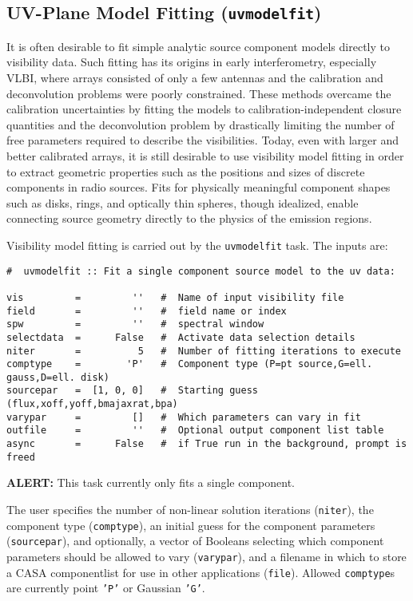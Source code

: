 {%
\subsection{UV-Plane Model Fitting ({\tt uvmodelfit})}
\label{section:cal.other.uvmodelfit}

It is often desirable to fit simple analytic source component models
directly to visibility data.  Such fitting has its origins in early
interferometry, especially VLBI, where arrays consisted of only a few
antennas and the calibration and deconvolution problems were poorly
constrained.  These methods overcame the calibration uncertainties by
fitting the models to calibration-independent closure quantities and
the deconvolution problem by drastically limiting the number of free
parameters required to describe the visibilities.  Today, even with
larger and better calibrated arrays, it is still desirable to use
visibility model fitting in order to extract geometric properties such
as the positions and sizes of discrete components in radio sources.
Fits for physically meaningful component shapes such as disks, rings,
and optically thin spheres, though idealized, enable connecting source
geometry directly to the physics of the emission regions.

Visibility model fitting is carried out by the {\tt uvmodelfit} task.
The inputs are:
\small
\begin{verbatim}
#  uvmodelfit :: Fit a single component source model to the uv data:

vis         =         ''   #  Name of input visibility file
field       =         ''   #  field name or index
spw         =         ''   #  spectral window
selectdata  =      False   #  Activate data selection details
niter       =          5   #  Number of fitting iterations to execute
comptype    =        'P'   #  Component type (P=pt source,G=ell. gauss,D=ell. disk)
sourcepar   =  [1, 0, 0]   #  Starting guess (flux,xoff,yoff,bmajaxrat,bpa)
varypar     =         []   #  Which parameters can vary in fit
outfile     =         ''   #  Optional output component list table
async       =      False   #  if True run in the background, prompt is freed
\end{verbatim}
\normalsize
{\bf ALERT:} This task currently only fits a single component.

The user specifies the number of non-linear solution
iterations ({\tt niter}), the component type ({\tt comptype}), an
initial guess for the component parameters ({\tt sourcepar}), and
optionally, a vector of Booleans selecting which component parameters
should be allowed to vary ({\tt varypar}), and a filename in which to
store a CASA componentlist for use in other applications ({\tt file}).
Allowed {\tt comptype}s are currently point {\tt 'P'} or
Gaussian {\tt 'G'}.

}

